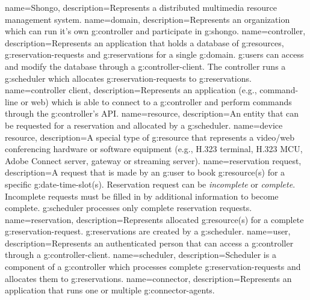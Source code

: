 {
  name=Shongo,
  description={Represents a distributed multimedia resource management system.}
}
{
  name=domain,
  description={Represents an organization which can run it's own \gls{g:controller} and participate in \gls{g:shongo}.}
}
{
  name=controller,
  description={Represents an application that holds a database of 
    \glspl{g:resource}, \glspl{g:reservation-request} and \glspl{g:reservation} 
    for a single \gls{g:domain}. \Glspl{g:user} can access and modify the database 
    through a \gls{g:controller-client}. The controller runs a \gls{g:scheduler}
    which allocates \glspl{g:reservation-request} to \glspl{g:reservation}.}
}
{
  name=controller client,
  description={Represents an application (e.g., command-line or web) which is able to
    connect to a \gls{g:controller} and perform commands through the \gls{g:controller}'s API.}
}
{
  name=resource,
  description={An entity that can be requested for a reservation and allocated 
  by a \gls{g:scheduler}.}
}
{
  name=device resource,
  description={A special type of \gls{g:resource} that represents a video/web 
    conferencing hardware or software equipment (e.g., H.323 terminal, H.323 
    MCU, Adobe Connect server, gateway or streaming server).}
}
{
  name=reservation request,
  description={A request that is made by an \gls{g:user} to book \gls{g:resource}(s)
    for a specific \gls{g:date-time-slot}(s). Reservation request can be \emph{incomplete} 
    or \emph{complete}. Incomplete requests must be filled in by 
    additional information to become complete. \Gls{g:scheduler} processes only 
    complete reservation requests.}
}
{
  name=reservation,
  description={Represents allocated \gls{g:resource}(s) for a complete 
    \gls{g:reservation-request}. \Glspl{g:reservation} are created by a \gls{g:scheduler}.}
}
{
  name=user,
  description={Represents an authenticated person that can access a \gls{g:controller} 
    through a \gls{g:controller-client}.}
}
{
  name=scheduler,
  description={Scheduler is a component of a \gls{g:controller} which processes 
    complete \glspl{g:reservation-request} and allocates them to \glspl{g:reservation}.}
}
{
  name=connector,
  description={Represents an application that runs one or multiple \glspl{g:connector-agent}.}
}
